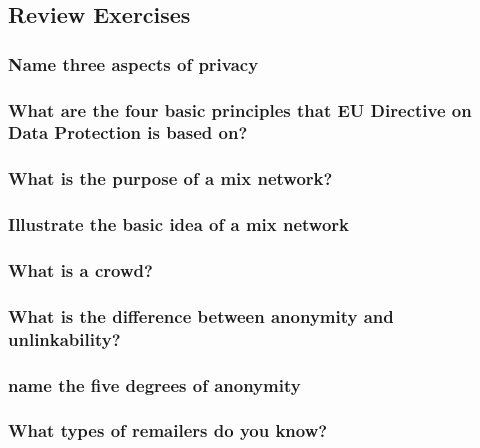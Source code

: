 \documentclass[a4paper, 10 pt, conference]{ieeeconf}
\begin{document}
\subsection{\textbf{Review Exercises}}
\subsubsection{\textbf{Name three aspects of privacy}}

\subsubsection{\textbf{What are the four basic principles that EU Directive on Data Protection is based on?}}

\subsubsection{\textbf{What is the purpose of a mix network?}}

\subsubsection{\textbf{Illustrate the basic idea of a mix network}}

\subsubsection{\textbf{What is a crowd?}}

\subsubsection{\textbf{What is the difference between anonymity and unlinkability?}}

\subsubsection{\textbf{name the five degrees of anonymity}}

\subsubsection{\textbf{What types of remailers do you know?}}


\end{document}

